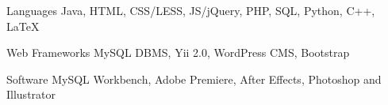 


\begin{cvskills}


\cvskill
{Languages} %
{Java, HTML, CSS/LESS, JS/jQuery, PHP, SQL, Python, C++, LaTeX} %


\cvskill
{Web Frameworks} %
{MySQL DBMS, Yii 2.0, WordPress CMS, Bootstrap} %


\cvskill
{Software} %
{MySQL Workbench, Adobe Premiere, After Effects, Photoshop and Illustrator} %


\end{cvskills}